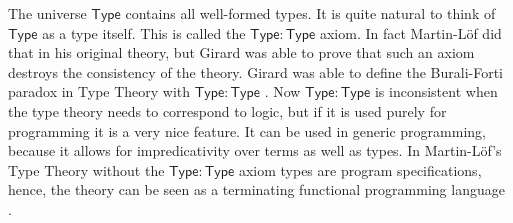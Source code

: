 The universe $\mathsf{Type}$ contains all well-formed types.  It is
quite natural to think of $\mathsf{Type}$ as a type itself.  This is
called the $\mathsf{Type}:\mathsf{Type}$ axiom.  In fact Martin-L\"of
did that in his original theory, but Girard was able to prove that
such an axiom destroys the consistency of the theory.  Girard was able
to define the Burali-Forti paradox in Type Theory with
$\mathsf{Type}:\mathsf{Type}$ \cite{Coquand:1986,Coquand:1994}.  Now
$\mathsf{Type}:\mathsf{Type}$ is inconsistent when the type theory
needs to correspond to logic, but if it is used purely for programming
it is a very nice feature.  It can be used in generic programming,
because it allows for impredicativity over terms as well as types.  In
Martin-L\"of's Type Theory without the $\mathsf{Type}:\mathsf{Type}$
axiom types are program specifications, hence, the theory can be seen
as a terminating functional programming
language \cite{Nordstrom:1990}.  
